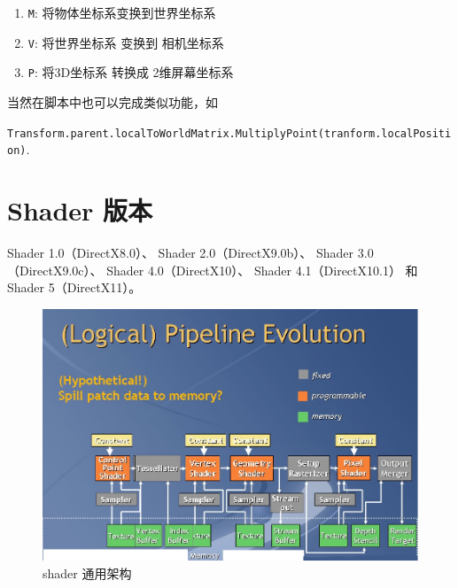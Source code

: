 \documentclass[UTF8,a4paper,12pt]{ctexbook}
\begin{document}
				\begin{enumerate}[itemindent = 1em]
					\item \verb|M|: 将物体坐标系变换到世界坐标系
					\item \verb|V|: 将世界坐标系 变换到 相机坐标系
					\item \verb|P|: 将3D坐标系 转换成 2维屏幕坐标系
				\end{enumerate}
				
				当然在脚本中也可以完成类似功能，如
			
			\verb|Transform.parent.localToWorldMatrix.MultiplyPoint(tranform.localPosition)|.
	\section{Shader 版本}
			Shader 1.0（DirectX8.0）、
			Shader 2.0（DirectX9.0b）、
			Shader 3.0（DirectX9.0c）、
			Shader 4.0（DirectX10）、
			Shader 4.1（DirectX10.1）
			和Shader 5（DirectX11）。
	
			\begin{figure}[H]
				\centering
				\includegraphics[scale=0.71]{ShaderArc}
				\caption{shader  通用架构}
			\end{figure}
			
			
\end{document}
